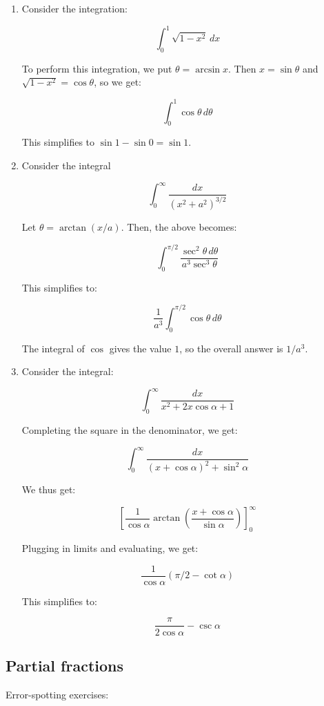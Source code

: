 \documentclass[10pt]{amsart}
\begin{document}
\begin{enumerate}
\item Consider the integration:

  $$\int_0^1 \sqrt{1 - x^2} \, dx$$

  To perform this integration, we put $\theta = \arcsin x$. Then $x =
  \sin \theta$ and $\sqrt{1 -x^2}= \cos \theta$, so we get:

  $$\int_0^1 \cos \theta \, d\theta$$

  This simplifies to $\sin 1 - \sin 0 = \sin 1$.

\item Consider the integral

  $$\int_0^\infty \frac{dx}{(x^2 + a^2)^{3/2}}$$

  Let $\theta = \arctan(x/a)$. Then, the above becomes:

  $$\int_0^{\pi/2} \frac{\sec^2 \theta \, d\theta}{a^3 \sec^3 \theta}$$

  This simplifies to:

  $$\frac{1}{a^3} \int_0^{\pi/2} \cos \theta \, d\theta$$

  The integral of $\cos$ gives the value $1$, so the overall answer is
  $1/a^3$.

\item Consider the integral:

  $$\int_0^\infty \frac{dx}{x^2 + 2x \cos\alpha + 1}$$

  Completing the square in the denominator, we get:

  $$\int_0^\infty \frac{dx}{(x + \cos \alpha)^2 + \sin^2\alpha}$$

  We thus get:

  $$\left[\frac{1}{\cos \alpha} \arctan\left(\frac{x + \cos \alpha}{\sin\alpha}\right)\right]_0^\infty$$

  Plugging in limits and evaluating, we get:

  $$\frac{1}{\cos \alpha} (\pi/2 - \cot \alpha)$$

  This simplifies to:

  $$\frac{\pi}{2 \cos \alpha} - \csc \alpha$$

\end{enumerate}


\subsection{Partial fractions}

Error-spotting exercises:
\end{document}
